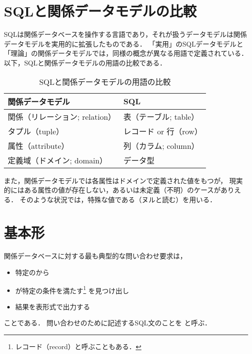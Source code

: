 \section{SQLと関係データモデルの比較}
SQLは関係データベースを操作する言語であり，それが扱うデータモデルは関係データモデルを実用的に拡張したものである．
「実用」のSQLデータモデルと「理論」の関係データモデルでは，同様の概念が異なる用語で定義されている．
以下，SQLと関係データモデルの用語の比較である．

\begin{table}[tb]
    \centering
    \caption{SQLと関係データモデルの用語の比較}
    \begin{tabular}{ll}
    \toprule
    \textbf{関係データモデル}             & \textbf{SQL}            \\ \midrule
    関係（リレーション; relation） & 表（テーブル; table） \\
    タプル（tuple）           & レコード or 行（row） \\
    属性（attribute）        & 列（カラム; column） \\
    定義域（ドメイン; domain）    & データ型           \\ \bottomrule
    \end{tabular}
    \end{table}

また，関係データモデルでは各属性はドメインで定義された値をもつが，
現実的にはある属性の値が存在しない，あるいは未定義（不明）のケースがありえる．
そのような状況では，特殊な値である（ヌルと読む）を用いる．


\section{基本形}
関係データベースに対する最も典型的な問い合わせ要求は，
\begin{itemize}
\item 特定のから
\item {} が特定の条件を満たす\footnote{レコード（record）と呼ぶこともある．} を見つけ出し
\item 結果を表形式で出力する
\end{itemize}
ことである．
問い合わせのために記述するSQL文のことを と呼ぶ．

